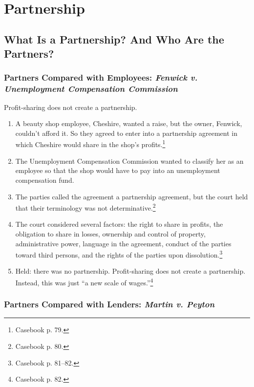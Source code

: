 \section{Partnership}

\subsection{What Is a Partnership? And Who Are the Partners?}

\subsubsection{Partners Compared with Employees: \emph{Fenwick v. Unemployment 
Compensation Commission}}
\label{par:fenwick-ucc}
Profit-sharing does not create a partnership.

\begin{enumerate}
    \item A beauty shop employee, Cheshire, wanted a raise, but the owner, 
    Fenwick, couldn't afford it. So they agreed to enter into a partnership 
    agreement in which Cheshire would share in the shop's 
    profits.\footnote{Casebook p. 79.}
    \item The Unemployment Compensation Commission wanted to classify her as 
    an employee so that the shop would have to pay into an unemployment 
    compensation fund.
    \item The parties called the agreement a partnership agreement, but the 
    court held that their terminology was not determinative.\footnote{Casebook 
    p. 80.}
    \item The court considered several factors: the right to share in profits, 
    the obligation to share in losses, ownership and control of property, 
    administrative power, language in the agreement, conduct of the parties 
    toward third persons, and the rights of the parties upon 
    dissolution.\footnote{Casebook p. 81--82.}
    \item Held: there was no partnership. Profit-sharing does not create a 
    partnership. Instead, this was just ``a new scale of 
    wages.''\footnote{Casebook p. 82.}
\end{enumerate}

\subsubsection{Partners Compared with Lenders: \emph{Martin v. Peyton}}

